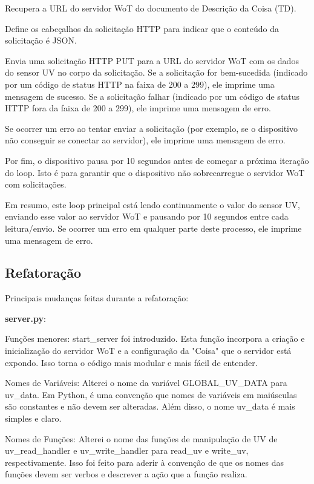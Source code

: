 Recupera a URL do servidor WoT do documento de Descrição da Coisa (TD).

Define os cabeçalhos da solicitação HTTP para indicar que o conteúdo da solicitação é JSON.

Envia uma solicitação HTTP PUT para a URL do servidor WoT com os dados do sensor UV no corpo da solicitação. Se a solicitação for bem-sucedida (indicado por um código de status HTTP na faixa de 200 a 299), ele imprime uma mensagem de sucesso. Se a solicitação falhar (indicado por um código de status HTTP fora da faixa de 200 a 299), ele imprime uma mensagem de erro.

Se ocorrer um erro ao tentar enviar a solicitação (por exemplo, se o dispositivo não conseguir se conectar ao servidor), ele imprime uma mensagem de erro.

Por fim, o dispositivo pausa por 10 segundos antes de começar a próxima iteração do loop. Isto é para garantir que o dispositivo não sobrecarregue o servidor WoT com solicitações.

Em resumo, este loop principal está lendo continuamente o valor do sensor UV, enviando esse valor ao servidor WoT e pausando por 10 segundos entre cada leitura/envio. Se ocorrer um erro em qualquer parte deste processo, ele imprime uma mensagem de erro.

\subsection{Refatoração}

Principais mudanças feitas durante a refatoração:

\textbf{server.py}:

Funções menores: start\_server foi introduzido. Esta função incorpora a criação e inicialização do servidor WoT e a configuração da "Coisa" que o servidor está expondo. Isso torna o código mais modular e mais fácil de entender.

Nomes de Variáveis: Alterei o nome da variável GLOBAL\_UV\_DATA para uv\_data. Em Python, é uma convenção que nomes de variáveis em maiúsculas são constantes e não devem ser alteradas. Além disso, o nome uv\_data é mais simples e claro.

Nomes de Funções: Alterei o nome das funções de manipulação de UV de uv\_read\_handler e uv\_write\_handler para read\_uv e write\_uv, respectivamente. Isso foi feito para aderir à convenção de que os nomes das funções devem ser verbos e descrever a ação que a função realiza.

